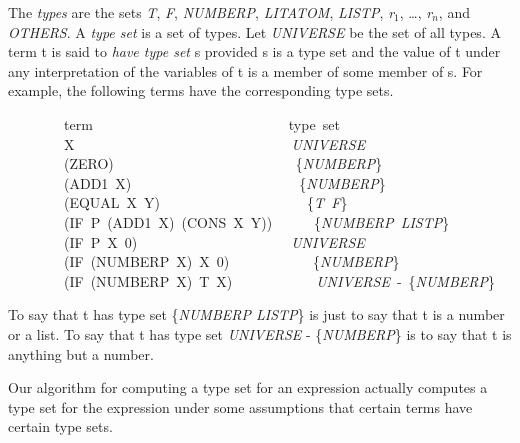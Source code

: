 \documentclass[11pt]{book}
\newenvironment{pubasis}{\begin{flushleft}\ttfamily\small}{\normalsize\rmfamily\end{flushleft}}
\newcommand{\pubinlineunderline}[1]{\emph{#1}}
\begin{document}
The \pubinlineunderline{types} are the sets  \pubinlineunderline{T}, \pubinlineunderline{F}, \pubinlineunderline{NUMBERP},
\pubinlineunderline{LITATOM}, \pubinlineunderline{LISTP}, \pubinlineunderline{r}$_{1}$, \ldots{}, \pubinlineunderline{r}$_{n}$, and \pubinlineunderline{OTHERS}.
A \pubinlineunderline{type set} is a set of types.  Let \pubinlineunderline{UNIVERSE}
be the set of all types.  A term t is said to
\pubinlineunderline{have type set} s provided s is a type set and
the value of t under any interpretation of the variables
of t is a member of some member of s.  For example,
the following terms have the corresponding type sets.
\begin{pubasis}
~~~~~~~~term~~~~~~~~~~~~~~~~~~~~~~~~~~~~type~set\\

~~~~~~~~X~~~~~~~~~~~~~~~~~~~~~~~~~~~~~~~\pubinlineunderline{UNIVERSE}\\

~~~~~~~~(ZERO)~~~~~~~~~~~~~~~~~~~~~~~~~~\{\pubinlineunderline{NUMBERP}\}\\

~~~~~~~~(ADD1~X)~~~~~~~~~~~~~~~~~~~~~~~~\{\pubinlineunderline{NUMBERP}\}\\

~~~~~~~~(EQUAL~X~Y)~~~~~~~~~~~~~~~~~~~~~\{\pubinlineunderline{T~F}\}\\

~~~~~~~~(IF~P~(ADD1~X)~(CONS~X~Y))~~~~~~\{\pubinlineunderline{NUMBERP~LISTP}\}\\

~~~~~~~~(IF~P~X~0)~~~~~~~~~~~~~~~~~~~~~~\pubinlineunderline{UNIVERSE}\\

~~~~~~~~(IF~(NUMBERP~X)~X~0)~~~~~~~~~~~~\{\pubinlineunderline{NUMBERP}\}\\

~~~~~~~~(IF~(NUMBERP~X)~T~X)~~~~~~~~~~~~\pubinlineunderline{UNIVERSE}~-~\{\pubinlineunderline{NUMBERP}\}\\
\end{pubasis}
To say that t has type set \{\pubinlineunderline{NUMBERP LISTP}\} is just
to say that t is a number or a list.  To say that t has type
set \pubinlineunderline{UNIVERSE} - \{\pubinlineunderline{NUMBERP}\} is to say that t is anything
but a number.

Our algorithm for computing a type set for an expression
actually computes a type set for the expression under
some assumptions that certain terms have certain
type sets.
\end{document}

